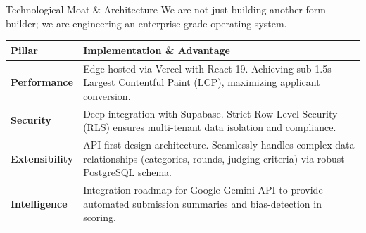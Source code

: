 \documentclass[aspectratio=169, 10pt]{beamer}
\begin{document}
\begin{frame}{Technological Moat \& Architecture}
    We are not just building another form builder; we are engineering an enterprise-grade operating system.
    
    \vspace{0.4cm}
    \begin{table}[]
        \centering
        \renewcommand{\arraystretch}{1.5}
        \begin{tabularx}{\textwidth}{l X}
            \toprule
            \textbf{Pillar} & \textbf{Implementation \& Advantage} \\
            \midrule
            \textbf{Performance} & Edge-hosted via Vercel with React 19. Achieving sub-1.5s Largest Contentful Paint (LCP), maximizing applicant conversion. \\
            \textbf{Security} & Deep integration with Supabase. Strict Row-Level Security (RLS) ensures multi-tenant data isolation and compliance. \\
            \textbf{Extensibility} & API-first design architecture. Seamlessly handles complex data relationships (categories, rounds, judging criteria) via robust PostgreSQL schema. \\
            \textbf{Intelligence} & Integration roadmap for Google Gemini API to provide automated submission summaries and bias-detection in scoring. \\
            \bottomrule
        \end{tabularx}
    \end{table}
\end{frame}
\end{document}
